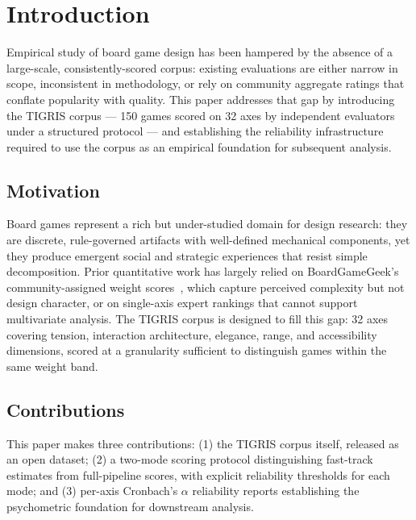 \section{Introduction}
\label{sec:intro}

Empirical study of board game design has been hampered by the absence of a large-scale,
consistently-scored corpus: existing evaluations are either narrow in scope, inconsistent
in methodology, or rely on community aggregate ratings that conflate popularity with quality.
This paper addresses that gap by introducing the TIGRIS corpus --- 150 games scored on 32
axes by independent evaluators under a structured protocol --- and establishing the
reliability infrastructure required to use the corpus as an empirical foundation for
subsequent analysis.

\subsection{Motivation}

Board games represent a rich but under-studied domain for design research: they are
discrete, rule-governed artifacts with well-defined mechanical components, yet they produce
emergent social and strategic experiences that resist simple decomposition.
Prior quantitative work has largely relied on BoardGameGeek's community-assigned weight
scores~\cite{woods2012eurogames}, which capture perceived complexity but not design
character, or on single-axis expert rankings that cannot support multivariate analysis.
The TIGRIS corpus is designed to fill this gap: 32 axes covering tension, interaction
architecture, elegance, range, and accessibility dimensions, scored at a granularity
sufficient to distinguish games within the same weight band.

\subsection{Contributions}

This paper makes three contributions: (1) the TIGRIS corpus itself, released as an open
dataset; (2) a two-mode scoring protocol distinguishing fast-track estimates from
full-pipeline scores, with explicit reliability thresholds for each mode; and (3)
per-axis Cronbach's $\alpha$ reliability reports establishing the psychometric foundation
for downstream analysis.
